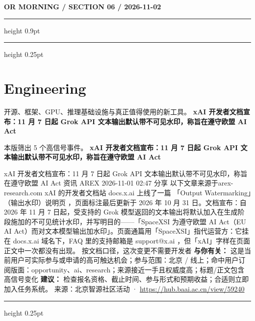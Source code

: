 \documentclass[10.5pt]{ctexart}
\begin{document}
\newpage
{\small\bfseries OR MORNING / SECTION 06 / 2026-11-02}
\vspace{2mm}
\hrule height 0.9pt
\vspace{1.5mm}
\hrule height 0.25pt
\vspace{4mm}
\section*{Engineering}
{\color{ormuted} 开源、框架、GPU、推理基础设施与真正值得使用的新工具。}
\vspace{2mm}
{\LARGE\bfseries xAI 开发者文档宣布：11 月 7 日起 Grok API 文本输出默认带不可见水印，称旨在遵守欧盟 AI Act}\par
\vspace{1mm}
{\color{ormuted} 本版筛出 5 个高信号事件。}
\vspace{3mm}
{\Large\bfseries xAI 开发者文档宣布：11 月 7 日起 Grok API 文本输出默认带不可见水印，称旨在遵守欧盟 AI Act}\par
xAI 开发者文档宣布：11 月 7 日起 Grok API 文本输出默认带不可见水印，称旨在遵守欧盟 AI Act 资讯 AREX 2026-11-01 02:47 分享 以下文章来源于arex-research.com xAI 的开发者文档站 docs.x.ai 上线了一篇 「Output Watermarking」（输出水印）说明页 ，页面标注最后更新于 2026 年 10 月 31 日。文档宣布：自 2026 年 11 月 7 日起，受支持的 Grok 模型返回的文本输出将默认加入在生成阶段施加的不可见统计水印，并写明目的——「SpaceXSI 为遵守欧盟 AI Act（EU AI Act）而对文本模型输出加水印」。页面通篇用「SpaceXSI」指代运营方：它挂在 docs.x.ai 域名下，FAQ 里的支持邮箱是 support@x.ai ，但「xAI」字样在页面正文中一次都没有出现。 按文档口径，这次变更不需要开发者
\textbf{与你有关：} 这是当前用户可实际参与或申请的高可触达机会；参与范围：北京 / 线上；命中用户订阅版面：opportunity、ai、research；来源接近一手且权威度高；标题/正文包含高信号变化
\textbf{建议：} 检查报名资格、截止时间、参与形式和预期收益；合适则立即加入任务系统。
{\footnotesize\color{ormuted} 来源：北京智源社区活动 · \url{https://hub.baai.ac.cn/view/59240}}
\vspace{4mm}
\hrule height 0.25pt
\vspace{3mm}
\end{document}
